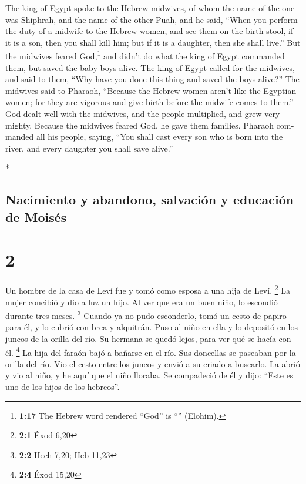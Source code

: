 \begin{paracol}{2}
\begin{otherlanguage}{english}
 The king of Egypt spoke to the Hebrew midwives, of whom
the name of the one was Shiphrah, and the name of the other Puah,
 and he said, ``When you perform the duty of a midwife to
the Hebrew women, and see them on the birth stool, if it is a son, then
you shall kill him; but if it is a daughter, then she shall live.''
 But the midwives feared God,\footnote{\textbf{1:17} The
  Hebrew word rendered ``God'' is ``'' (Elohim).} and
didn't do what the king of Egypt commanded them, but saved the baby boys
alive.  The king of Egypt called for the midwives, and
said to them, ``Why have you done this thing and saved the boys alive?''
 The midwives said to Pharaoh, ``Because the Hebrew women
aren't like the Egyptian women; for they are vigorous and give birth
before the midwife comes to them.''  God dealt well with
the midwives, and the people multiplied, and grew very mighty.
 Because the midwives feared God, he gave them families.
 Pharaoh commanded all his people, saying, ``You shall
cast every son who is born into the river, and every daughter you shall
save alive.''

\end{otherlanguage}

\switchcolumn[0]*

\hypertarget{nacimiento-y-abandono-salvaciuxf3n-y-educaciuxf3n-de-moisuxe9s}{%
\subsection{Nacimiento y abandono, salvación y educación de
Moisés}\label{nacimiento-y-abandono-salvaciuxf3n-y-educaciuxf3n-de-moisuxe9s}}

\hypertarget{section-2}{%
\section{2}\label{section-2}}

 Un hombre de la casa de Leví fue y tomó como esposa a una
hija de Leví. \footnote{\textbf{2:1} Éxod 6,20}  La mujer
concibió y dio a luz un hijo. Al ver que era un buen niño, lo escondió
durante tres meses. \footnote{\textbf{2:2} Hech 7,20; Heb 11,23}
 Cuando ya no pudo esconderlo, tomó un cesto de papiro
para él, y lo cubrió con brea y alquitrán. Puso al niño en ella y lo
depositó en los juncos de la orilla del río.  Su hermana
se quedó lejos, para ver qué se hacía con él. \footnote{\textbf{2:4}
  Éxod 15,20}  La hija del faraón bajó a bañarse en el
río. Sus doncellas se paseaban por la orilla del río. Vio el cesto entre
los juncos y envió a su criado a buscarlo.  La abrió y vio
al niño, y he aquí que el niño lloraba. Se compadeció de él y dijo:
``Este es uno de los hijos de los hebreos''.


\end{paracol}
